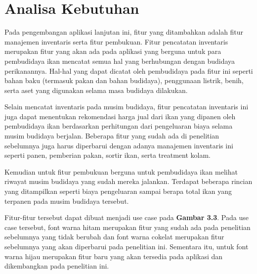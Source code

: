 \section{Analisa Kebutuhan}

Pada pengembangan aplikasi lanjutan ini, fitur yang ditambahkan adalah fitur manajemen inventaris serta fitur pembukuan. Fitur pencatatan inventaris merupakan fitur yang akan ada pada aplikasi yang berguna untuk para pembudidaya ikan mencatat semua hal yang berhubungan dengan budidaya perikanannya. Hal-hal yang dapat dicatat oleh pembudidaya pada fitur ini seperti bahan baku (termasuk pakan dan bahan budidaya), penggunaan listrik, benih, serta aset yang digunakan selama masa budidaya dilakukan.

Selain mencatat inventaris pada musim budidaya, fitur pencatatan inventaris ini juga dapat menentukan rekomendasi harga jual dari ikan yang dipanen oleh pembudidaya ikan berdasarkan perhitungan dari pengeluaran biaya selama musim budidaya berjalan. Beberapa fitur yang sudah ada di penelitian sebelumnya juga harus diperbarui dengan adanya manajemen inventaris ini seperti panen, pemberian pakan, sortir ikan, serta treatment kolam.

Kemudian untuk fitur pembukuan berguna untuk pembudidaya ikan melihat riwayat musim budidaya yang sudah mereka jalankan. Terdapat beberapa rincian yang ditampilkan seperti biaya pengeluaran sampai berapa total ikan yang terpanen pada musim budidaya tersebut.

Fitur-fitur tersebut dapat dibuat menjadi use case pada \textbf{Gambar 3.3}. Pada use case tersebut, font warna hitam merupakan fitur yang sudah ada pada penelitian sebelumnya yang tidak berubah dan font warna cokelat merupakan fitur sebelumnya yang akan diperbarui pada penelitian ini. Sementara itu, untuk font warna hijau merupakan fitur baru yang akan tersedia pada aplikasi dan dikembangkan pada penelitian ini.

